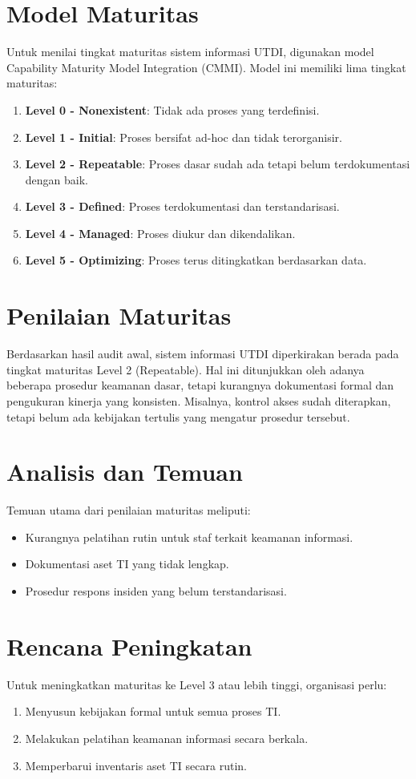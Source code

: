 \documentclass[12pt, a4paper]{report}
\begin{document}
\section{Model Maturitas}
Untuk menilai tingkat maturitas sistem informasi UTDI, digunakan model Capability Maturity Model Integration (CMMI). Model ini memiliki lima tingkat maturitas:
\begin{enumerate}
    \item \textbf{Level 0 - Nonexistent}: Tidak ada proses yang terdefinisi.
    \item \textbf{Level 1 - Initial}: Proses bersifat ad-hoc dan tidak terorganisir.
    \item \textbf{Level 2 - Repeatable}: Proses dasar sudah ada tetapi belum terdokumentasi dengan baik.
    \item \textbf{Level 3 - Defined}: Proses terdokumentasi dan terstandarisasi.
    \item \textbf{Level 4 - Managed}: Proses diukur dan dikendalikan.
    \item \textbf{Level 5 - Optimizing}: Proses terus ditingkatkan berdasarkan data.
\end{enumerate}

\section{Penilaian Maturitas}
Berdasarkan hasil audit awal, sistem informasi UTDI diperkirakan berada pada tingkat maturitas Level 2 (Repeatable). Hal ini ditunjukkan oleh adanya beberapa prosedur keamanan dasar, tetapi kurangnya dokumentasi formal dan pengukuran kinerja yang konsisten. Misalnya, kontrol akses sudah diterapkan, tetapi belum ada kebijakan tertulis yang mengatur prosedur tersebut.

\section{Analisis dan Temuan}
Temuan utama dari penilaian maturitas meliputi:
\begin{itemize}
    \item Kurangnya pelatihan rutin untuk staf terkait keamanan informasi.
    \item Dokumentasi aset TI yang tidak lengkap.
    \item Prosedur respons insiden yang belum terstandarisasi.
\end{itemize}

\section{Rencana Peningkatan}
Untuk meningkatkan maturitas ke Level 3 atau lebih tinggi, organisasi perlu:
\begin{enumerate}
    \item Menyusun kebijakan formal untuk semua proses TI.
    \item Melakukan pelatihan keamanan informasi secara berkala.
    \item Memperbarui inventaris aset TI secara rutin.
\end{enumerate}
\end{document}
